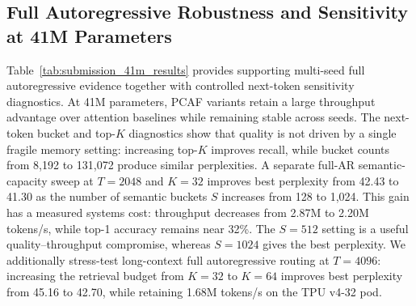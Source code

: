 \documentclass[11pt]{article}
\begin{document}
\subsection{Full Autoregressive Robustness and Sensitivity at 41M Parameters}

Table~\ref{tab:submission_41m_results} provides supporting multi-seed full
autoregressive evidence together with controlled next-token sensitivity
diagnostics. At 41M parameters, PCAF variants retain a large throughput
advantage over attention baselines while remaining stable across seeds. The
next-token bucket and top-$K$ diagnostics show that quality is not driven by a
single fragile memory setting: increasing top-$K$ improves recall, while bucket
counts from 8,192 to 131,072 produce similar perplexities. A separate full-AR
semantic-capacity sweep at $T=2048$ and $K=32$ improves best perplexity from
42.43 to 41.30 as the number of semantic buckets $S$ increases from 128 to
1,024. This gain has a measured systems cost: throughput decreases from 2.87M
to 2.20M tokens/s, while top-1 accuracy remains near 32\%. The $S=512$ setting
is a useful quality--throughput compromise, whereas $S=1024$ gives the best
perplexity. We additionally stress-test long-context full autoregressive
routing at $T=4096$: increasing the retrieval budget from $K=32$ to $K=64$
improves best perplexity from 45.16 to 42.70, while retaining 1.68M tokens/s
on the TPU v4-32 pod.
\end{document}
